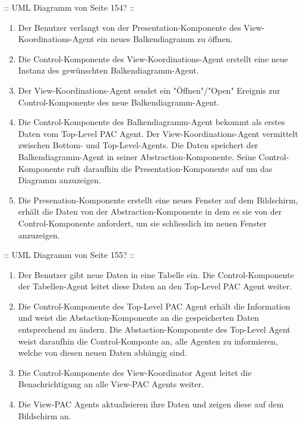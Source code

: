:: UML Diagramm von Seite 154? ::

\begin{enumerate}
	\item Der Benutzer verlangt von der Presentation-Komponente des View-Koordinations-Agent ein neues Balkendiagramm zu öffnen.
	\item Die Control-Komponente des View-Koordinations-Agent erstellt eine neue Instanz des gewünschten Balkendiagramm-Agent.
	\item Der View-Koordinations-Agent sendet ein "Öffnen"/"Open" Ereignis zur Control-Komponente des neue Balkendiagramm-Agent.
	\item Die Control-Komponente des Balkendiagramm-Agent bekommt als erstes Daten vom Top-Level PAC Agent. Der View-Koordinations-Agent vermittelt zwischen Bottom- und Top-Level-Agents. Die Daten speichert der Balkendiagramm-Agent in seiner Abstraction-Komponente. Seine Control-Komponente ruft daraufhin die Presentation-Komponente auf um das Diagramm anzuzeigen.
	\item Die Presenation-Komponente erstellt eine neues Fenster auf dem Bildschirm, erhält die Daten von der Abstraction-Komponente in dem es sie von der Control-Komponente anfordert, um sie schliesslich im neuen Fenster anzuzeigen.
\end{enumerate}


:: UML Diagramm von Seite 155? ::

\begin{enumerate}
	\item Der Benutzer gibt neue Daten in eine Tabelle ein. Die Control-Komponente der Tabellen-Agent leitet diese Daten an den Top-Level PAC Agent weiter.
	\item Die Control-Komponente des Top-Level PAC Agent erhält die Information und weist die Abstaction-Komponente an die gespeicherten Daten entsprechend zu ändern. Die Abstaction-Komponente des Top-Level Agent weist daraufhin die Control-Komponte an, alle Agenten zu informieren, welche von diesen neuen Daten abhängig sind.
	\item Die Control-Komponente des View-Koordinator Agent leitet die Benachrichtigung an alle View-PAC Agents weiter.
	\item Die View-PAC Agents aktualisieren ihre Daten und zeigen diese auf dem Bildschirm an.
\end{enumerate}


